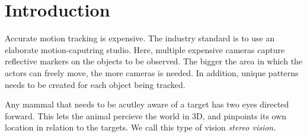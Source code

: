 \chapter{Introduction}





Accurate motion tracking is expensive. The industry standard is to use an elaborate motion-caputring studio. Here, multiple expensive cameras capture reflective markers on the objects to be observed. The bigger the area in which the actors can freely move, the more cameras is needed. In addition, unique patterns needs to be created for each object being tracked.

Any mammal that needs to be acutley aware of a target has two eyes directed forward. This lets the animal percieve the world in 3D, and pinpoints its own location in relation to the targets. We call this type of vision \emph{stereo vision}.





